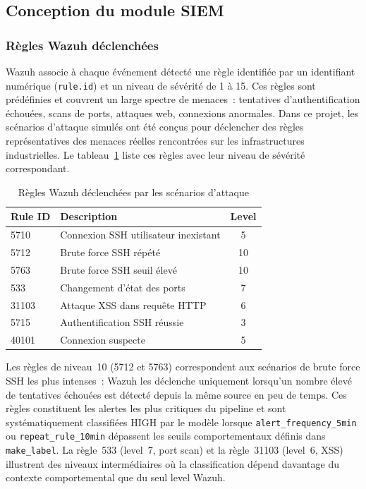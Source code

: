 \documentclass[12pt,a4paper]{report}
\begin{document}
\subsection{Conception du module SIEM}

\subsubsection{Règles Wazuh déclenchées}

Wazuh associe à chaque événement détecté une règle identifiée par un identifiant numérique (\texttt{rule.id}) et un niveau de sévérité de 1 à 15. Ces règles sont prédéfinies et couvrent un large spectre de menaces~: tentatives d'authentification échouées, scans de ports, attaques web, connexions anormales. Dans ce projet, les scénarios d'attaque simulés ont été conçus pour déclencher des règles représentatives des menaces réelles rencontrées sur les infrastructures industrielles. Le tableau~\ref{tab:regles} liste ces règles avec leur niveau de sévérité correspondant.

\begin{table}[H]
\centering
\caption{Règles Wazuh déclenchées par les scénarios d'attaque}
\label{tab:regles}
\begin{tabular}{|l|l|c|}
\hline
\rowcolor{ColSection!15}
\textbf{Rule ID} & \textbf{Description} & \textbf{Level} \\
\hline
5710  & Connexion SSH utilisateur inexistant      & 5  \\
5712  & Brute force SSH répété                    & 10 \\
5763  & Brute force SSH seuil élevé               & 10 \\
533   & Changement d'état des ports               & 7  \\
31103 & Attaque XSS dans requête HTTP             & 6  \\
5715  & Authentification SSH réussie              & 3  \\
40101 & Connexion suspecte                        & 5  \\
\hline
\end{tabular}
\end{table}

Les règles de niveau~10 (5712 et 5763) correspondent aux scénarios de brute force SSH les plus intenses~: Wazuh les déclenche uniquement lorsqu'un nombre élevé de tentatives échouées est détecté depuis la même source en peu de temps. Ces règles constituent les alertes les plus critiques du pipeline et sont systématiquement classifiées HIGH par le modèle lorsque \texttt{alert\_frequency\_5min} ou \texttt{repeat\_rule\_10min} dépassent les seuils comportementaux définis dans \texttt{make\_label}. La règle~533 (level~7, port scan) et la règle~31103 (level~6, XSS) illustrent des niveaux intermédiaires où la classification dépend davantage du contexte comportemental que du seul level Wazuh.
\end{document}
